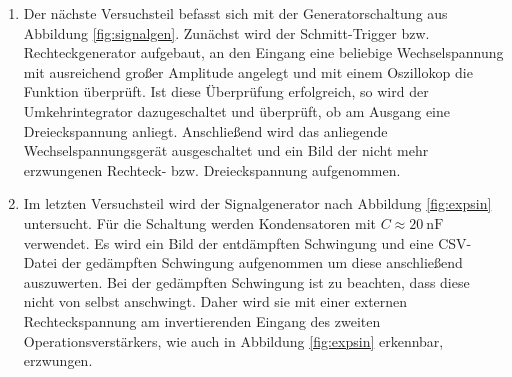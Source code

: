 \begin{enumerate}
  \item Der nächste Versuchsteil befasst sich mit der Generatorschaltung aus Abbildung \ref{fig:signalgen}.
  Zunächst wird der Schmitt-Trigger bzw. Rechteckgenerator aufgebaut, an den Eingang eine beliebige Wechselspannung mit ausreichend
  großer Amplitude angelegt und mit einem Oszillokop die Funktion überprüft. Ist diese Überprüfung erfolgreich, so
  wird der Umkehrintegrator dazugeschaltet und überprüft, ob am Ausgang eine Dreieckspannung anliegt. Anschließend
  wird das anliegende Wechselspannungsgerät ausgeschaltet und ein Bild der nicht mehr erzwungenen Rechteck-
  bzw. Dreieckspannung aufgenommen.

  \item Im letzten Versuchsteil wird der Signalgenerator nach Abbildung \ref{fig:expsin} untersucht. Für die
  Schaltung werden Kondensatoren mit $C \approx \SI{20}{\nano\farad}$ verwendet. Es wird ein Bild der
  entdämpften Schwingung und eine CSV-Datei der gedämpften Schwingung aufgenommen um diese anschließend
  auszuwerten. Bei der gedämpften Schwingung ist zu beachten, dass diese nicht von selbst anschwingt. Daher
  wird sie mit einer externen Rechteckspannung am invertierenden Eingang des zweiten Operationsverstärkers, wie auch
  in Abbildung \ref{fig:expsin} erkennbar, erzwungen.
\end{enumerate}
